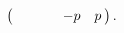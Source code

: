 \documentclass[a4paper,11pt]{amsart}
\begin{document}
\begin{equation}
\begin{pmatrix}
\hspace{2pt} &  & %
&  &\hspace*{-6pt}-p & p\hspace{2pt}
\end{pmatrix}.
\label{equ1}
\end{equation}
\end{document}
